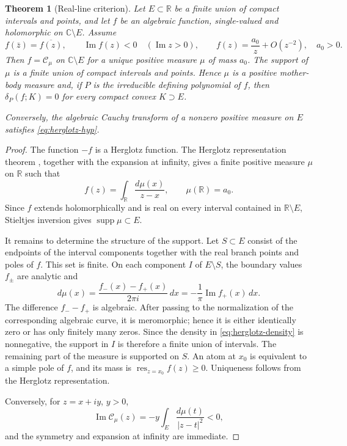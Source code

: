 \documentclass[10pt,a4paper]{amsart}
\newtheorem{theorem}{Theorem}[section]
\newcommand{\bC}{\mathbb C}
\newcommand{\bR}{\mathbb R}
\newcommand{\Cauchy}{\mathcal C}
\newcommand{\supp}{\operatorname{supp}}
\renewcommand{\Im}{\operatorname{Im}}
\begin{document}
\begin{theorem}[Real-line criterion]\label{thm:herglotz}
Let $E\subset\bR$ be a finite union of compact intervals and points, and let
$f$ be an algebraic function, single-valued and holomorphic on $\bC\setminus E$.
Assume
\begin{equation}\label{eq:herglotz-hyp}
 f(\bar z)=\overline{f(z)},\qquad
 \Im f(z)<0\quad(\Im z>0),\qquad
 f(z)=\frac{a_0}{z}+O(z^{-2}),\quad a_0>0.
\end{equation}
Then $f=\Cauchy_\mu$ on $\bC\setminus E$ for a unique positive measure $\mu$
of mass $a_0$.  The support of $\mu$ is a finite union of compact intervals and
points.  Hence $\mu$ is a positive mother-body measure and, if $P$ is the irreducible
defining polynomial of $f$, then $\delta_P(f;K)=0$ for every compact convex
$K\supset E$.

Conversely, the algebraic Cauchy transform of a nonzero positive measure on
$E$ satisfies \eqref{eq:herglotz-hyp}.
\end{theorem}

\begin{proof}
The function $-f$ is a Herglotz function.  The Herglotz representation theorem
\cite[Chapter~III]{Donoghue}, together with the expansion at infinity, gives a
finite positive measure $\mu$ on $\bR$ such that
\[
 f(z)=\int_{\bR}\frac{d\mu(x)}{z-x},\qquad \mu(\bR)=a_0.
\]
Since $f$ extends holomorphically and is real on every interval contained in
$\bR\setminus E$, Stieltjes inversion gives $\supp\mu\subset E$.

It remains to determine the structure of the support.  Let $S\subset E$ consist
of the endpoints of the interval components together with the real branch
points and poles of $f$.  This set is finite.  On each component $I$ of
$E\setminus S$, the boundary values $f_\pm$ are analytic and
\begin{equation}\label{eq:herglotz-density}
 d\mu(x)=\frac{f_-(x)-f_+(x)}{2\pi i}\,dx
        =-\frac1\pi\Im f_+(x)\,dx.
\end{equation}
The difference $f_--f_+$ is algebraic.  After passing to the normalization of
the corresponding algebraic curve, it is meromorphic; hence it is either
identically zero or has only finitely many zeros.  Since the density in
\eqref{eq:herglotz-density} is nonnegative, the support in $I$ is therefore a
finite union of intervals.  The remaining part of the measure is supported on
$S$.  An atom at $x_0$ is equivalent to a simple pole of $f$, and its mass is
$\operatorname*{res}_{z=x_0}f(z)\ge0$.  Uniqueness follows from the Herglotz
representation.

Conversely, for $z=x+iy$, $y>0$,
\[
 \Im\Cauchy_\mu(z)=-y\int_E\frac{d\mu(t)}{|z-t|^2}<0,
\]
and the symmetry and expansion at infinity are immediate.
\end{proof}
\end{document}

